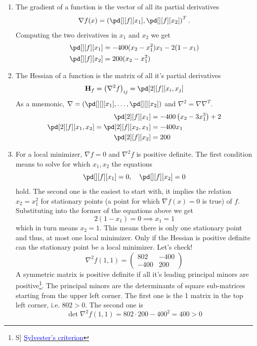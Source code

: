 \begin{enumerate}[label = \roman*)]
    \item The gradient of a function is the vector of all its partial derivatives \[
              \nabla f (x) =\left(\pd[][f][x_1], \pd[][f][x_2]\right)^T.
          \]
          Computing the two derivatives in $x_1$ and $x_2$ we get
          \begin{align*}
              \pd[][f][x_1] & = -400(x_2 - x_1^2)x_1 - 2(1-x_1) \\
              \pd[][f][x_2] & = 200(x_2-x_1^2)
          \end{align*}
    \item The Hessian of a function is the matrix of all it's partial derivatives
          \[
              \textbf{H}_f = \left(\nabla^2 f\right)_{ij} = \pd[2][f][x_i,x_j]
          \]
          As a mnemonic, $\nabla = \left(\pd[][][x_1], \dots, \pd[][][x_2]\right)$ and $\nabla^2 = \nabla\nabla^T$.
          \begin{align*}
              \pd[2][f][x_1]                          & = -400\left(x_2 - 3x_1^3\right) + 2 \\
              \pd[2][f][x_1,x_2] = \pd[2][f][x_2,x_1] & = -400x_1                           \\
              \pd[2][f][x_2]                          & = 200
          \end{align*}
    \item For a local minimizer, $\nabla f = 0$ and $\nabla^2f$ is positive definite.
          The first condition means to solve for which $x_1, x_2$ the equations
          \[
              \pd[][f][x_1] = 0, \quad \pd[][f][x_2] = 0
          \]
          hold.
          The second one is the easiest to start with, it implies the relation $x_2 = x_1^2$ for stationary points (a point for which $\nabla f(x) = 0$ is true) of $f$.
          Substituting into the former of the equations above we get
          \[
              2(1 - x_1) = 0 \implies x_1 = 1
          \]
          which in turn means $x_2 = 1$.
          This means there is only one stationary point and thus, at most one local minimizer.
          Only if the Hessian is positive definite can the stationary point be a local minimizer. Let's check!
          \[
              \nabla^2f(1,1) =
              \begin{pmatrix}
                  802  & -400 \\
                  -400 & 200
              \end{pmatrix}
          \]
          A symmetric matrix is positive definite if all it's leading principal minors are positive\footnote{S] \href{https://en.wikipedia.org/wiki/Sylvester\%27s_criterion}{\textcolor{blue}{Sylvester's criterion}}}. The principal minors are the determinants of square sub-matrices starting from the upper left corner.
          The first one is the 1  matrix in the top left corner, i.e. $802>0$.
          The second one is
          \[
              \operatorname{det}\nabla^2 f(1,1) = 802\cdot200 - 400^2 = 400 > 0
          \]
          \hfill\sq
\end{enumerate}
